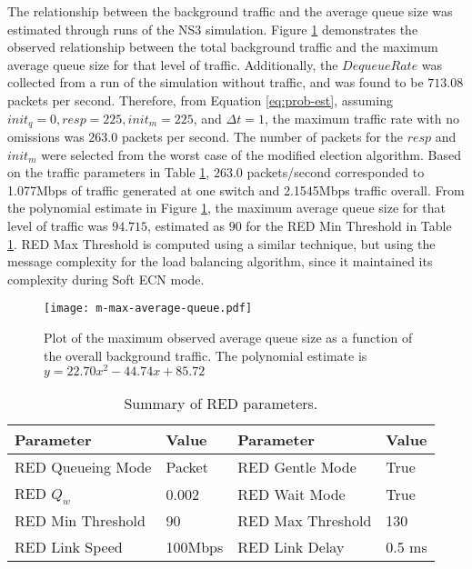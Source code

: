 The relationship between the background traffic and the average queue size was estimated through runs of the \ac{NS3} simulation.
Figure \ref{fig:plotm} demonstrates the observed relationship between the total background traffic and the maximum average queue size for that level of traffic.
Additionally, the $DequeueRate$ was collected from a run of the simulation without traffic, and was found to be $713.08$ packets per second.
Therefore, from Equation \ref{eq:prob-est}, assuming $init_q=0, resp=225, init_m=225$, and $\Delta t=1$, the maximum traffic rate with no omissions was $263.0$ packets per second.
The number of packets for the $resp$ and $init_m$ were selected from the worst case of the modified election algorithm.
Based on the traffic parameters in Table \ref{tab:red-parameters}, $263.0$ packets/second corresponded to 1.077Mbps of traffic generated at one switch and 2.1545Mbps traffic overall.
From the polynomial estimate in Figure \ref{fig:plotm}, the maximum average queue size for that level of traffic was $94.715$, estimated as $90$ for the \ac{RED} Min Threshold in Table \ref{tab:red-parameters}.
RED Max Threshold is computed using a similar technique, but using the message complexity for the load balancing algorithm, since it maintained its complexity during Soft ECN mode.

\begin{figure}[htbp]
\centering
\texttt{[image: m-max-average-queue.pdf]}
\caption[Plot of the maximum observed average queue size as a function of the overall background traffic.]{Plot of the maximum observed average queue size as a function of the overall background traffic. The polynomial estimate is $y=22.70x^2-44.74x+85.72$}
\label{fig:plotm}
\end{figure}

\begin{table}
\centering
\caption{Summary of \ac{RED} parameters.}
    \label{tab:red-parameters}
\begin{tabular}{ | l | l || l | l | } \hline
Parameter & Value & Parameter & Value        \\ \hline
RED Queueing Mode & Packet & RED Gentle Mode & True    \\ \hline
RED $Q_{w}$ & 0.002 & RED Wait Mode & True      \\ \hline
RED Min Threshold & 90 & RED Max Threshold & 130   \\ \hline
RED Link Speed & 100Mbps & RED Link Delay & 0.5 ms   \\ \hline
\end{tabular}
\end{table}


